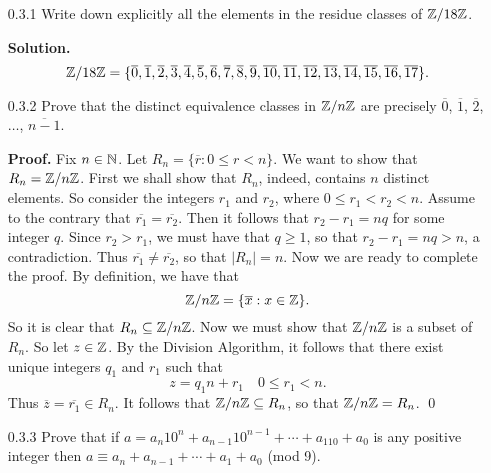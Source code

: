 \begin{enumerate}
   \item[0.3.1]   Write down explicitly all the elements in the residue classes
                  of $\mathbb{Z}/18\mathbb{Z}$.
   
      \textbf{Solution.}
      $$\mathbb{Z}/18\mathbb{Z} = \{\overline{0},  \overline{1},  \overline{2},  \overline{3},
                    \overline{4},  \overline{5},  \overline{6},  \overline{7},
                    \overline{8},  \overline{9},  \overline{10}, \overline{11},
                    \overline{12}, \overline{13}, \overline{14}, \overline{15},
                    \overline{16}, \overline{17}\}.$$
   \item[0.3.2]   Prove that the distinct equivalence classes in $\mathbb{Z}/n\mathbb{Z}$ are
                  precisely $\overline{0}$, $\overline{1}$, $\overline{2}$,
                  $\ldots$, $\overline{n - 1}$.
                  
      \textbf{Proof.} Fix $n \in \mathbb{N}$. Let
      $R_n = \{\overline{r} : 0 \le r < n\}$. We want to show that
      $R_n = \mathbb{Z}/n\mathbb{Z}$. First we shall show that $R_n$, indeed, contains $n$
      distinct elements. So consider the integers $r_1$ and $r_2$, where
      $0 \le r_1 < r_2 < n$. Assume to the contrary that
      $\overline{r_1} = \overline{r_2}$. Then it follows that
      $r_2 - r_1 = nq$ for some integer $q$. Since $r_2 > r_1$, we must have
      that $q \ge 1$, so that $r_2  - r_1 = nq > n$, a contradiction. Thus
      $\overline{r_1} \neq \overline{r_2}$, so that $|R_n| = n$. Now we are
      ready to complete the proof. By definition, we have that
      $$\mathbb{Z}/n\mathbb{Z} = \{\overline{x} : x \in \mathbb{Z}\}.$$
      So it is clear that $R_n \subseteq \mathbb{Z}/n\mathbb{Z}$. Now we must show that $\mathbb{Z}/n\mathbb{Z}$
      is a subset of $R_n$. So let $z \in \mathbb{Z}$. By the Division Algorithm, it
      follows that there exist unique integers $q_1$ and $r_1$ such that
      $$z = q_1n + r_1 \quad 0 \le r_1 < n.$$
      Thus $\overline{z} = \overline{r_1} \in R_n$. It follows that
      $\mathbb{Z}/n\mathbb{Z} \subseteq R_n$, so that $\mathbb{Z}/n\mathbb{Z} = R_n$. \qed
   \item[0.3.3]   Prove that if
                  $a = a_n10^n + a_{n - 1}10^{n - 1} + \cdots + a_110 + a_0$ is
                  any positive integer then $a \equiv a_n + a_{n - 1} + \cdots +
                  a_1 + a_0$ (mod 9).
                  

\end{enumerate}
